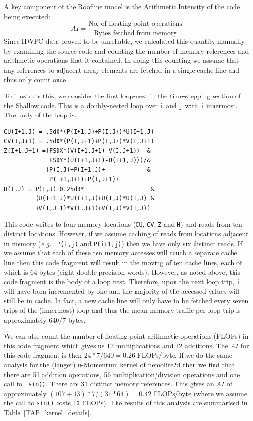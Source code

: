 \documentclass[12pt]{article}
\begin{document}
A key component of the Roofline model is the Arithmetic Intensity of
the code being executed:
\begin{equation}
AI = \frac{\textrm{No. of floating-point operations}}{\textrm{Bytes fetched from memory}}
\end{equation}
Since HWPC data proved to be unreliable, we calculated this quantity
manually by examining the source code and counting the number of
memory references and arithmetic operations that it contained. In
doing this counting we assume that any references to adjacent array
elements are fetched in a single cache-line and thus only count once.

To illustrate this, we consider the first loop-nest in the
time-stepping section of the Shallow code. This is a doubly-nested
loop over {\tt i} and {\tt j} with {\tt i} innermost. The body of the
loop is:
\begin{verbatim}
CU(I+1,J) = .5d0*(P(I+1,J)+P(I,J))*U(I+1,J)
CV(I,J+1) = .5d0*(P(I,J+1)+P(I,J))*V(I,J+1)
Z(I+1,J+1) =(FSDX*(V(I+1,J+1)-V(I,J+1))- &
             FSDY*(U(I+1,J+1)-U(I+1,J)))/&
            (P(I,J)+P(I+1,J)+            &
             P(I+1,J+1)+P(I,J+1))
H(I,J) = P(I,J)+0.25d0*                   &
         (U(I+1,J)*U(I+1,J)+U(I,J)*U(I,J) & 
         +V(I,J+1)*V(I,J+1)+V(I,J)*V(I,J))
\end{verbatim}
This code writes to four memory locations ({\tt CU}, {\tt CV}, {\tt Z}
and {\tt H}) and reads from ten distinct locations.  However, if we
assume caching of reads from locations adjacent in memory ({\it e.g.} {\tt
  P(i,j)} and {\tt P(i+1,j)}) then we have only six distinct reads.
If we assume that each of these ten memory accesses will touch a
separate cache line then this code fragment will result in the moving
of ten cache lines, each of which is 64 bytes (eight double-precision
words). However, as noted above, this code fragment is the body of a
loop nest. Therefore, upon the next loop trip, {\tt i} will have been
incremented by one and the majority of the accessed values will still
be in cache. In fact, a new cache line will only have to be fetched
every seven trips of the (innermost) loop and thus the mean memory
traffic per loop trip is approximately $640/7$ bytes.

We can also count the number of floating-point arithmetic operations
(FLOPs) in this code fragment which gives us 12 multiplications and 12
additions. The $AI$ for this code fragment is then $24*7/640 = 0.26$
FLOPs/byte.  If we do the same analysis for the (longer) u-Momentum
kernel of nemolite2d then we find that there are 51 addition
operations, 56 multiplication/division operations and one call to {\tt
  sin()}. There are 31 distinct memory references. This gives an $AI$
of approximately $(107+13)*7/(31*64) = 0.42$ FLOPs/byte (where we
assume the call to {\tt sin()} costs 13 FLOPs). The results of this
analysis are summarised in Table~\ref{TAB_kernel_details}.
\end{document}
